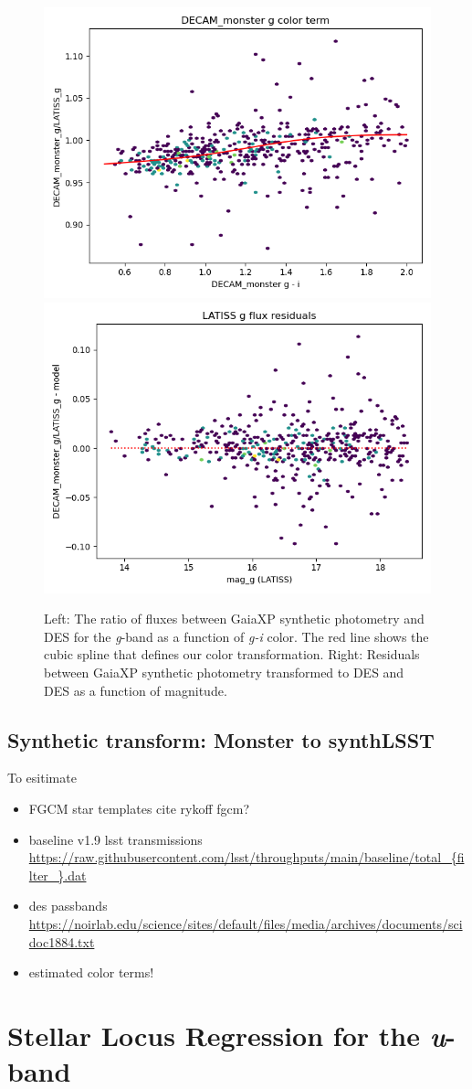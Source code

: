 \begin{figure}
    \includegraphics[width=0.49\linewidth]{./figures/color_terms/DECam_monster_to_LATISS_band_g_color_term.png}
    \includegraphics[width=0.49\linewidth]{./figures/color_terms/DECam_monster_to_LATISS_band_g_flux_residuals.png}
    \caption{Left: The ratio of fluxes between GaiaXP synthetic photometry and DES for the \textit{g}-band as a function of \textit{g-i} color. The red line shows the cubic spline that defines our color transformation.
    Right: Residuals between GaiaXP synthetic photometry transformed to DES and DES as a function of magnitude.}
    \label{fig:color-monster-to-comcam-g}
\end{figure}

\subsection{Synthetic transform: Monster to  synthLSST}
To esitimate
\begin{itemize}
    \item FGCM star templates cite rykoff fgcm? 
    \item baseline v1.9 lsst transmissions \url{https://raw.githubusercontent.com/lsst/throughputs/main/baseline/total_{filter_}.dat}
    \item des passbands \url{https://noirlab.edu/science/sites/default/files/media/archives/documents/scidoc1884.txt}
    \item estimated color terms!
\end{itemize}
\section{Stellar Locus Regression for the \textit{u}-band}
\label{sec:slr}

